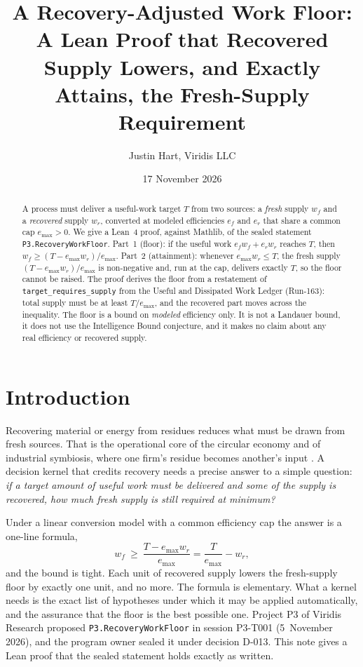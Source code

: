 \documentclass[11pt]{article}
\title{A Recovery-Adjusted Work Floor:\\ A Lean Proof that Recovered Supply Lowers, and Exactly Attains, the Fresh-Supply Requirement}
\author{Justin Hart, Viridis LLC}
\date{17 November 2026}
\theoremstyle{definition}
\theoremstyle{remark}
\begin{document}
\maketitle

\begin{abstract}
A process must deliver a useful-work target $T$ from two sources: a \emph{fresh} supply $w_f$
and a \emph{recovered} supply $w_r$, converted at modeled efficiencies $e_f$ and $e_r$ that share
a common cap $e_{\max}>0$. We give a Lean~4 proof, against Mathlib, of the sealed statement
\texttt{P3.RecoveryWorkFloor}. Part~1 (floor): if the useful work $e_fw_f+e_rw_r$ reaches $T$,
then $w_f\ge (T-e_{\max}w_r)/e_{\max}$. Part~2 (attainment): whenever $e_{\max}w_r\le T$, the
fresh supply $(T-e_{\max}w_r)/e_{\max}$ is non-negative and, run at the cap, delivers exactly $T$,
so the floor cannot be raised. The proof derives the floor from a restatement of
\texttt{target\_requires\_supply} from the Useful and Dissipated Work Ledger (Run-163): total supply
must be at least $T/e_{\max}$, and the recovered part moves across the inequality. The floor is a
bound on \emph{modeled} efficiency only. It is not a Landauer bound, it does not use the
Intelligence Bound conjecture, and it makes no claim about any real efficiency or recovered supply.
\end{abstract}

\section{Introduction}
Recovering material or energy from residues reduces what must be drawn from fresh sources. That
is the operational core of the circular economy \citep{geissdoerfer2017} and of industrial
symbiosis, where one firm's residue becomes another's input \citep{chertow2000}. A decision
kernel that credits recovery needs a precise answer to a simple question: \emph{if a target amount
of useful work must be delivered and some of the supply is recovered, how much fresh supply is
still required at minimum?}

Under a linear conversion model with a common efficiency cap the answer is a one-line formula,
\[
w_f\ \ge\ \frac{T-e_{\max}w_r}{e_{\max}}=\frac{T}{e_{\max}}-w_r ,
\]
and the bound is tight. Each unit of recovered supply lowers the fresh-supply floor by exactly one
unit, and no more. The formula is elementary. What a kernel needs is the exact list of hypotheses
under which it may be applied automatically, and the assurance that the floor is the best possible
one. Project P3 of Viridis Research proposed \texttt{P3.RecoveryWorkFloor} in session P3-T001
(5~November 2026), and the program owner sealed it under decision D-013. This note gives a Lean
proof that the sealed statement holds exactly as written.
\end{document}
